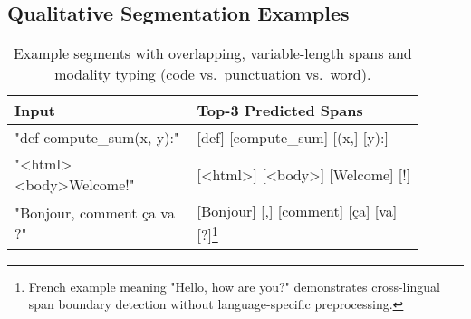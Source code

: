 \subsection{Qualitative Segmentation Examples}
\label{sec:qual-examples}

\begin{table}[H]
	\centering
	\begin{tabular}{@{}p{0.4\linewidth}p{0.5\linewidth}@{}}
		\toprule
		Input & Top-3 Predicted Spans \\
		\midrule
		"def compute\_sum(x, y):"       & [def] [compute\_sum] [(x,] [y):] \\
		"<html><body>Welcome!"         & [<html>] [<body>] [Welcome] [!] \\
		"Bonjour, comment ça va ?"      & [Bonjour] [,] [comment] [ça] [va] [?]\footnote{French example meaning "Hello, how are you?" demonstrates cross-lingual span boundary detection without language-specific preprocessing.} \\
		\bottomrule
	\end{tabular}
	\caption{Example segments with overlapping, variable-length spans and modality typing (code vs.\ punctuation vs.\ word).}
\end{table}
